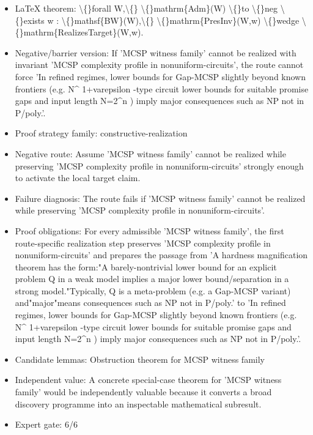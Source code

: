 \documentclass[11pt]{article}
\begin{document}
\begin{itemize}
\item LaTeX theorem: \textbackslash\{\}forall W,\textbackslash\{\} \textbackslash\{\}mathrm\{Adm\}(W) \textbackslash\{\}to \textbackslash\{\}neg \textbackslash\{\}exists w : \textbackslash\{\}mathsf\{BW\}(W),\textbackslash\{\} \textbackslash\{\}mathrm\{PresInv\}(W,w) \textbackslash\{\}wedge \textbackslash\{\}mathrm\{RealizesTarget\}(W,w).
\item Negative/barrier version: If 'MCSP witness family' cannot be realized with invariant 'MCSP complexity profile in nonuniform-circuits', the route cannot force 'In refined regimes, lower bounds for Gap-MCSP slightly beyond known frontiers (e.g. N\textasciicircum{} 1+varepsilon -type circuit lower bounds for suitable promise gaps and input length N=2\textasciicircum{}n ) imply major consequences such as NP not in P/poly.'.
\item Proof strategy family: constructive-realization
\item Negative route: Assume 'MCSP witness family' cannot be realized while preserving 'MCSP complexity profile in nonuniform-circuits' strongly enough to activate the local target claim.
\item Failure diagnosis: The route fails if 'MCSP witness family' cannot be realized while preserving 'MCSP complexity profile in nonuniform-circuits'.
\item Proof obligations: For every admissible 'MCSP witness family', the first route-specific realization step preserves 'MCSP complexity profile in nonuniform-circuits' and prepares the passage from 'A hardness magnification theorem has the form:"A barely-nontrivial lower bound for an explicit problem Q in a weak model implies a major lower bound/separation in a strong model."Typically, Q is a meta-problem (e.g. a Gap-MCSP variant) and"major"means consequences such as NP not in P/poly.' to 'In refined regimes, lower bounds for Gap-MCSP slightly beyond known frontiers (e.g. N\textasciicircum{} 1+varepsilon -type circuit lower bounds for suitable promise gaps and input length N=2\textasciicircum{}n ) imply major consequences such as NP not in P/poly.'.
\item Candidate lemmas: Obstruction theorem for MCSP witness family
\item Independent value: A concrete special-case theorem for 'MCSP witness family' would be independently valuable because it converts a broad discovery programme into an inspectable mathematical subresult.
\item Expert gate: 6/6
\end{itemize}
\end{document}

